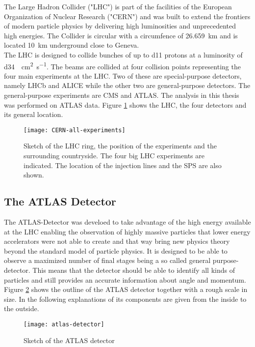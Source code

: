 The Large Hadron Collider ("LHC") is part of the facilities of the European Organization of Nuclear Research ("CERN") and was built to extend the frontiers of modern particle physics by delivering high luminosities and unprecedented high energies. The Collider is circular with a circumfence of \SI{26.659}{\km} and is located \SI{10}{\km} underground close to Geneva.\\
The LHC is designed to collide bunches of up to \num{d11} protons at a luminosity of \SI{d34}{\per\square\cm \per\s}. The beams are collided at four collision points representing the four main experiments at the LHC. Two of these are special-purpose detectors, namely LHCb and ALICE while the other two are general-purpose detectors.
The general-purpose experiments are CMS and ATLAS. The analysis in this thesis was performed on ATLAS data.
Figure \ref{fig:LHC} shows the LHC, the four detectors and its general location.
\begin{figure}[h]
  \centering
  \texttt{[image: CERN-all-experiments]}
  \caption[Sketch of the LHC ring, the position of the experiments and
  the surrounding countryside.]{Sketch of the LHC ring, the position
    of the experiments and the surrounding countryside. The four big
    LHC experiments are indicated. The location of the injection lines
    and the SPS are also shown. \cite{atlasfigures}}
  \label{fig:LHC}
\end{figure}


\subsection{The ATLAS Detector}

The ATLAS-Detector was develoed to take advantage of the high energy available at the LHC enabling the observation of highly massive particles that lower energy accelerators were not able to create and that way bring new physics theory beyond the standard model of particle physics.
It is designed to be able to observe a maximized number of final stages being a so called general purpose-detector. This means that the detector should be able to identify all kinds of particles and still provides an accurate information about angle and momentum.
Figure \ref{fig:atlas} shows the outline of the ATLAS detector together with a rough scale in size. In the following explanations of its components are given from the inside to the outside.

\begin{figure}[h]
  \centering
  \texttt{[image: atlas-detector]}
  \caption[Sketch of the ATLAS detector]{Sketch of the ATLAS detector \cite{atlasfigures}}
  \label{fig:atlas}
\end{figure}

